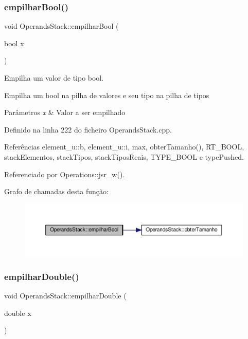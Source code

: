 \subsubsection{\texorpdfstring{empilhar\+Bool()}{empilharBool()}}
{\footnotesize\ttfamily void Operands\+Stack\+::empilhar\+Bool (\begin{DoxyParamCaption}\item[{bool}]{x }\end{DoxyParamCaption})}



Empilha um valor de tipo bool. 

Empilha um bool na pilha de valores e seu tipo na pilha de tipos


\begin{DoxyParams}{Parâmetros}
{\em x} & Valor a ser empilhado \\
\hline
\end{DoxyParams}


Definido na linha 222 do ficheiro Operands\+Stack.\+cpp.



Referências element\+\_\+u\+::b, element\+\_\+u\+::i, max, obter\+Tamanho(), R\+T\+\_\+\+B\+O\+OL, stack\+Elementos, stack\+Tipos, stack\+Tipos\+Reais, T\+Y\+P\+E\+\_\+\+B\+O\+OL e type\+Pushed.



Referenciado por Operations\+::jsr\+\_\+w().

Grafo de chamadas desta função\+:
\nopagebreak
\begin{figure}[H]
\begin{center}
\leavevmode
\includegraphics[width=350pt]{classOperandsStack_aca2be3100b76689949f029196a893712_cgraph}
\end{center}
\end{figure}
\mbox{\label{classOperandsStack_a45dde91cc54ad980d1cbb7cdb1e084cd}} 
\subsubsection{\texorpdfstring{empilhar\+Double()}{empilharDouble()}}
{\footnotesize\ttfamily void Operands\+Stack\+::empilhar\+Double (\begin{DoxyParamCaption}\item[{double}]{x }\end{DoxyParamCaption})}



